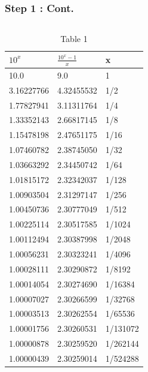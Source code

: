 \documentclass{beamer}
\begin{document}
\begin{frame}
    \frametitle{Step 1 : Cont.}
    \begin{columns}
    \begin{table}[]
        \tiny
        \caption{Table 1}
        \centering
        \def\arraystretch{1.2}
        \begin{tabular}{|l|l|l|} \hline
        $10^x$ & $\frac{10^x-1}{x}$ & x        \\ \hline  \hline
        10.0                  & 9.0                         & 1        \\ \hline
        3.16227766    & 4.32455532          & 1/2      \\ \hline
        1.77827941    & 3.11311764          & 1/4      \\ \hline
        1.33352143    & 2.66817145          & 1/8      \\ \hline
        1.15478198    & 2.47651175          & 1/16     \\ \hline
        1.07460782    & 2.38745050          & 1/32     \\ \hline
        1.03663292    & 2.34450742          & 1/64     \\ \hline
        1.01815172    & 2.32342037          & 1/128    \\ \hline
        1.00903504    & 2.31297147          & 1/256    \\ \hline
        1.00450736    & 2.30777049          & 1/512    \\ \hline
        1.00225114    & 2.30517585          & 1/1024   \\ \hline
        1.00112494    & 2.30387998          & 1/2048   \\ \hline
        1.00056231    & 2.30323241          & 1/4096   \\ \hline
        1.00028111    & 2.30290872          & 1/8192   \\ \hline
        1.00014054    & 2.30274690          & 1/16384  \\ \hline
        1.00007027    & 2.30266599          & 1/32768  \\ \hline
        1.00003513    & 2.30262554          & 1/65536  \\ \hline
        1.00001756    & 2.30260531         & 1/131072 \\ \hline
        1.00000878    & 2.30259520          & 1/262144 \\ \hline
        1.00000439    & 2.30259014          & 1/524288 \\ \hline

\end{tabular}
\end{table}
\end{columns}
\end{frame}
\end{document}
